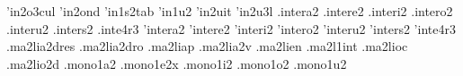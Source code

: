 {'in2o3cul                                                                       
'in2ond                                                                         
'in1s2tab                                                                       
'in1u2                                                                          
'in2uit                                                                         
'in2u3l                                                                         
.intera2                                                                        
.intere2                                                                        
.interi2                                                                        
.intero2                                                                        
.interu2                                                                        
.inters2                                                                        
.inte4r3                                                                        
'intera2                                                                        
'intere2                                                                        
'interi2                                                                        
'intero2                                                                        
'interu2                                                                        
'inters2                                                                        
'inte4r3                                                                        
.ma2lia2dres                                                                    
.ma2lia2dro                                                                     
.ma2liap                                                                        
.ma2lia2v                                                                       
.ma2lien                                                                        
.ma2l1int                                                                       
.ma2lioc                                                                        
.ma2lio2d                                                                       
.mono1a2                                                                        
.mono1e2x                                                                       
.mono1i2                                                                        
.mono1o2                                                                        
.mono1u2                                                                        
}
